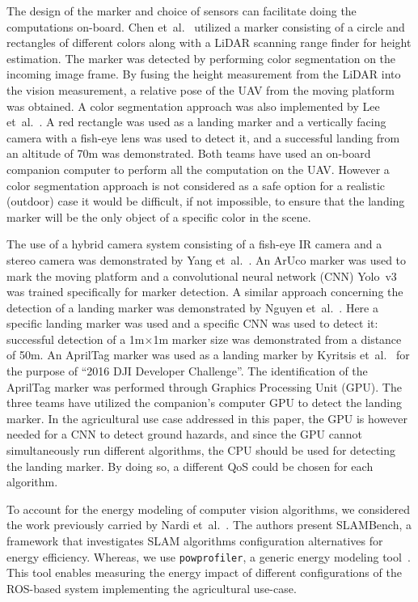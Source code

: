 \documentclass[conference]{IEEEtran}
\newcommand{\stt}[1]{{\small\tt #1}} %
\newcommand{\powprof}{\stt{powprofiler}}
\begin{document}
The design of the marker and choice of sensors can facilitate doing the computations on-board. %
%
Chen et~al.~\cite{chen2016system} utilized a marker consisting of a circle and rectangles of different colors along with a LiDAR scanning range finder for height estimation. The marker was detected by performing color segmentation on the incoming image frame. By fusing the height measurement from the LiDAR into the vision measurement, a relative pose of the UAV from the moving platform was obtained. A color segmentation approach was also implemented by Lee et~al.~\cite{lee2016vision}. A red rectangle was used as a landing marker and a vertically facing camera with a fish-eye lens was used to detect it, and a successful landing from an altitude of 70m was demonstrated. Both teams have used an on-board companion computer to perform all the computation on the UAV. However a color segmentation approach is not considered as a safe option for a realistic (outdoor) case it would be difficult, if not impossible, to ensure that the landing marker will be the only object of a specific color in the scene.

The use of a hybrid camera system consisting of a fish-eye IR camera and a stereo camera was demonstrated by Yang et~al.~\cite{yang2018hybrid}. An ArUco marker was used to mark the moving platform and a convolutional neural network (CNN) Yolo~v3 was trained specifically for marker detection. A similar approach concerning the detection of a landing marker was demonstrated by Nguyen et~al.~\cite{nguyen2018lightdenseyolo}. Here a specific landing marker was used and a specific CNN was used to detect it: successful detection of a 1m$\times$1m marker size was demonstrated from a distance of 50m. An AprilTag marker was used as a landing marker by Kyritsis et~al.~\cite{kyristsis2016towards} for the purpose of ``2016 DJI Developer Challenge''. The identification of the AprilTag marker was performed through Graphics Processing Unit (GPU). The three teams have utilized the companion's computer GPU to detect the landing marker. In the agricultural use case addressed in this paper, the GPU is however needed for a CNN to detect ground hazards, and since the GPU cannot simultaneously run different algorithms, %
the CPU should be used for detecting the landing marker. By doing so, a different QoS could be chosen for each algorithm.    

To account for the energy modeling of computer vision algorithms, we considered the work previously carried by Nardi et~al.~\cite{nardi2015introducing}. The authors present SLAMBench, a framework that investigates SLAM algorithms configuration alternatives for energy efficiency. Whereas, we use \powprof{}, a generic energy modeling tool~\cite{seewald2019coarse}. This tool enables measuring the energy impact of different configurations of the ROS-based system implementing the agricultural use-case.
\end{document}
